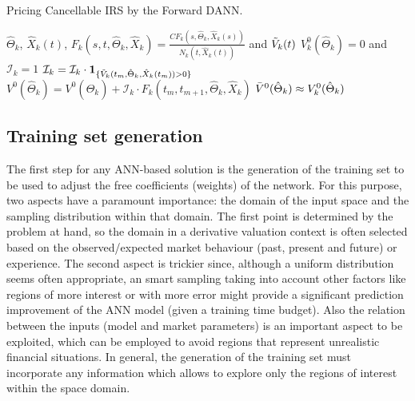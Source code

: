         \begin{algorithm}
        \caption{Pricing Cancellable IRS by the Forward DANN.}\label{alg:forwardMC}
            \begin{algorithmic}
            \Require $\hat{\Theta}_k$, $\hat{X}_k(t)$, $F_k(s, t,\hat{\Theta}_k, \hat{X}_k) = \frac{CF_k(s, \hat{\Theta}_k, \hat{X}_k(s))}{N_k(t, \hat{X}_k(t))}$ and $\Tilde{V}_k(t)$
            \Ensure $V_k^0(\hat{\Theta}_k) = 0$ and $\mathcal{I}_k = 1$
                \State $\mathcal{I}_k = \mathcal{I}_k\cdot \mathbf{1}_{\{\Tilde{V}_k(t_m, \hat{\Theta}_k, \hat{X}_k(t_m))>0\}}$ 
                \State $V^0(\hat{\Theta}_k) = V^0(\hat{\Theta}_k) + \mathcal{I}_k\cdot F_k(t_m, t_{m+1}, \hat{\Theta}_k, \hat{X}_k)$ 
            \EndFor
            \State $\Bar{V}^0(\hat{\Theta}_k) \approx V_k^0(\hat{\Theta}_k)$ 
        \end{algorithmic}
        \end{algorithm}


    \subsection{Training set generation}\label{sec:generation}

        The first step for any ANN-based solution is the generation of the training set to be used to adjust the free coefficients (weights) of the network. For this purpose, two aspects have a paramount importance: the domain of the input space and the sampling distribution within that domain. The first point is determined by the problem at hand, so the domain in a derivative valuation context is often selected based on the observed/expected market behaviour (past, present and future) or experience. The second aspect is trickier since, although a uniform distribution seems often appropriate, an smart sampling taking into account other factors like regions of more interest or with more error might provide a significant prediction improvement of the ANN model (given a training time budget). Also the  relation between the inputs (model and market parameters) is an important aspect to be exploited, which can be employed to avoid regions that represent unrealistic financial situations. In general, the generation of the training set must incorporate any information which allows to explore only the regions of interest within the space domain.
        
